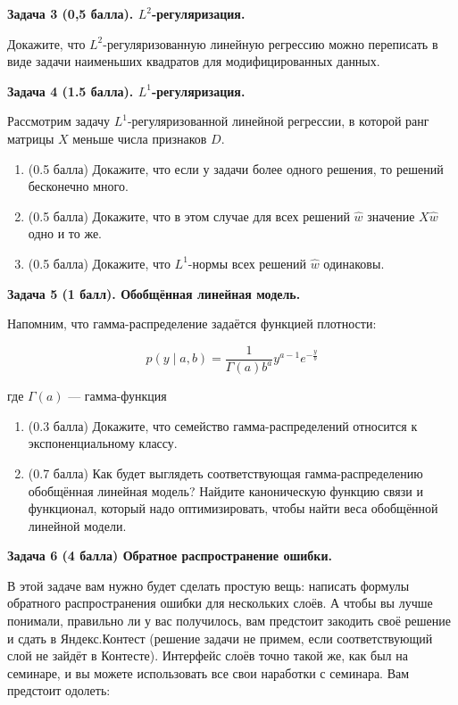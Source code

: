 \documentclass[10pt]{article}
\begin{document}
\bigskip



\textbf{Задача 3 (0,5 балла). $L^2$-регуляризация.}

Докажите, что $L^2$-регуляризованную линейную регрессию можно переписать в виде задачи наименьших квадратов для модифицированных данных.

\bigskip


\textbf{Задача 4 (1.5 балла). $L^1$-регуляризация.}

Рассмотрим задачу $L^1$-регуляризованной линейной регрессии, в которой ранг матрицы $X$ меньше числа признаков $D$. 

\begin{enumerate}
    \item{(0.5 балла)} Докажите, что если у задачи более одного решения, то решений бесконечно много.
    \item{(0.5 балла)} Докажите, что в этом случае для всех решений $\widehat{w}$ значение $X\widehat{w}$ одно и то же. 
    \item{(0.5 балла)} Докажите, что $L^1$-нормы всех решений $\widehat{w}$ одинаковы.
\end{enumerate}
\bigskip

\textbf{Задача 5 (1 балл). Обобщённая линейная модель.}

Напомним, что гамма-распределение задаётся функцией плотности:

$$p(y\mid a, b) = \frac1{\Gamma(a)b^a}{y^{a-1}e^{-\frac{y}{b}}}$$

где $\Gamma(a)$ --- гамма-функция

\begin{enumerate}
    \item{(0.3 балла)} Докажите, что семейство гамма-распределений относится к экспоненциальному классу.
    \item{(0.7 балла)} Как будет выглядеть соответствующая гамма-распределению обобщённая линейная модель? Найдите каноническую функцию связи и функционал, который надо оптимизировать, чтобы найти веса обобщённой линейной модели.
\end{enumerate}

\bigskip

\textbf{Задача 6 (4 балла) Обратное распространение ошибки.}

В этой задаче вам нужно будет сделать простую вещь: написать формулы обратного распространения ошибки для нескольких слоёв. А чтобы вы лучше понимали, правильно ли у вас получилось, вам предстоит закодить своё решение и сдать в Яндекс.Контест (решение задачи не примем, если соответствующий слой не зайдёт в Контесте). Интерфейс слоёв точно такой же, как был на семинаре, и вы можете использовать все свои наработки с семинара. Вам предстоит одолеть:
\end{document}
